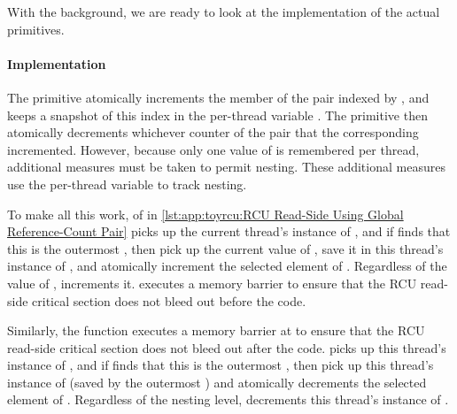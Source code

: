 With the background, we are ready to look at the implementation of the
actual primitives.

\fi

\paragraph{Implementation}

The  primitive atomically increments the member of the
 pair indexed by , and keeps a
snapshot of this index in the per-thread variable .
The  primitive then atomically decrements
whichever counter of the pair that the corresponding 
incremented.
However, because only one value of  is remembered per thread,
additional measures must be taken to permit nesting.
These additional measures use the per-thread  variable
to track nesting.

\begin{fcvref}
To make all this work,  of  in
\cref{lst:app:toyrcu:RCU Read-Side Using Global Reference-Count Pair}
picks up the
current thread's instance of , and if  finds
that this is the outermost ,
then  pick up the current value of
, save it in this thread's instance of ,
and atomically increment the selected element of .
Regardless of the value of ,  increments it.
 executes a memory barrier to ensure that the RCU read-side
critical section does not bleed out before the  code.
\end{fcvref}

\begin{fcvref}
Similarly, the  function executes a memory barrier
at 
to ensure that the RCU read-side critical section does not bleed out
after the  code.
 picks up this thread's instance of , and if
 finds that this is the outermost ,
then  pick up this thread's instance of 
(saved by the outermost ) and atomically decrements
the selected element of .
Regardless of the nesting level,  decrements this thread's
instance of .
\end{fcvref}

